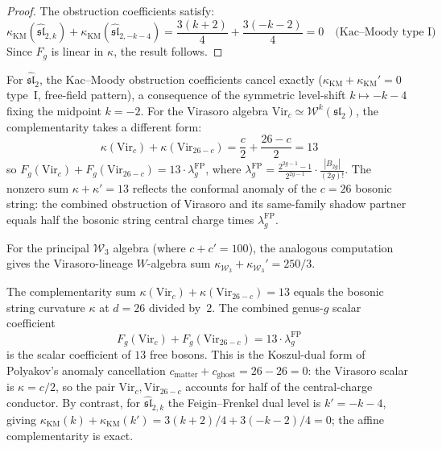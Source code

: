 \begin{proof}
The obstruction coefficients satisfy:
\[
\kappa_{\mathrm{KM}}(\widehat{\mathfrak{sl}}_{2,k}) + \kappa_{\mathrm{KM}}(\widehat{\mathfrak{sl}}_{2,-k-4}) = \frac{3(k+2)}{4} + \frac{3(-k-2)}{4} = 0 \quad \text{(Kac--Moody type~I)}
\]
Since $F_g$ is linear in $\kappa$, the result follows.
\end{proof}

\begin{remark}\label{rem:sl2-vs-vir-complementarity}

For $\widehat{\mathfrak{sl}}_2$, the Kac--Moody obstruction coefficients cancel exactly \textup{(}$\kappa_{\mathrm{KM}} + \kappa_{\mathrm{KM}}' = 0$ type~I, free-field pattern\textup{)}, a consequence of the symmetric level-shift $k \mapsto -k-4$ fixing the midpoint $k = -2$. For the Virasoro algebra $\mathrm{Vir}_c \simeq \mathcal{W}^k(\mathfrak{sl}_2)$, the complementarity takes a different form:
\[
\kappa(\mathrm{Vir}_c) + \kappa(\mathrm{Vir}_{26-c}) = \frac{c}{2} + \frac{26-c}{2} = 13
\]
so $F_g(\mathrm{Vir}_c) + F_g(\mathrm{Vir}_{26-c}) = 13 \cdot \lambda_g^{\mathrm{FP}}$, where $\lambda_g^{\mathrm{FP}} = \frac{2^{2g-1}-1}{2^{2g-1}} \cdot \frac{|B_{2g}|}{(2g)!}$. The nonzero sum $\kappa + \kappa' = 13$ reflects the conformal anomaly of the $c = 26$ bosonic string: the combined obstruction of Virasoro and its same-family shadow partner equals half the bosonic string central charge times $\lambda_g^{\mathrm{FP}}$.

For the principal $\mathcal{W}_3$ algebra (where $c + c' = 100$),
the analogous computation gives the Virasoro-lineage
$W$-algebra sum
$\kappa_{\mathcal{W}_3} + \kappa_{\mathcal{W}_3}' = 250/3$.
\end{remark}

\begin{remark}\label{rem:bosonic-string-anomaly-splitting}

The complementarity sum $\kappa(\mathrm{Vir}_c) + \kappa(\mathrm{Vir}_{26-c}) = 13$ equals the bosonic string curvature $\kappa$ at $d = 26$ divided by~$2$. The combined genus-$g$ scalar coefficient
\[
F_g(\mathrm{Vir}_c) + F_g(\mathrm{Vir}_{26-c}) = 13 \cdot \lambda_g^{\mathrm{FP}}
\]
is the scalar coefficient of $13$ free bosons. This is the
Koszul-dual form of Polyakov's anomaly cancellation
$c_{\mathrm{matter}}+c_{\mathrm{ghost}}=26-26=0$:
the Virasoro scalar is $\kappa=c/2$, so the pair
$\mathrm{Vir}_c,\mathrm{Vir}_{26-c}$ accounts for half of the
central-charge conductor. By contrast, for
$\widehat{\mathfrak{sl}}_{2,k}$ the Feigin--Frenkel dual level is
$k'=-k-4$, giving
$\kappa_{\mathrm{KM}}(k)+\kappa_{\mathrm{KM}}(k')
=3(k{+}2)/4+3(-k{-}2)/4=0$; the affine complementarity is exact.
\end{remark}

